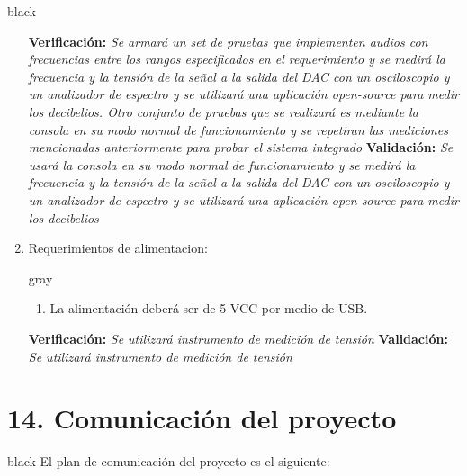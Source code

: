 \documentclass[11pt]{charter}
\begin{document}
\begin{consigna}{black}
\begin{enumerate}
	\textbf{Verificación:} \textit{Se armará un set de pruebas que implementen audios con frecuencias entre los rangos especificados en el requerimiento y se medirá la frecuencia y la tensión de la señal a la salida del DAC con un osciloscopio y  un analizador de espectro y se utilizará una aplicación \textit{open-source} para medir los decibelios. Otro conjunto de pruebas que se realizará es mediante la consola en su modo normal de funcionamiento y se repetiran las mediciones mencionadas anteriormente para probar el sistema integrado} \newline                                                                              
	\newline 
	\textbf{Validación:} \textit{Se usará la consola en su modo normal de funcionamiento y se medirá la frecuencia y la tensión de la señal a la salida del DAC con un osciloscopio y  un analizador de espectro y se utilizará una aplicación \textit{open-source} para medir los decibelios}
\item Requerimientos de alimentacion:
	\begin{consigna}{gray}
	\begin{enumerate}
	\item La alimentación deberá ser de 5 VCC por medio de USB.
	\end{enumerate}
	\end{consigna}
	\textbf{Verificación:} \textit{Se utilizará instrumento de medición de tensión} \newline 			\newline                                                                              
	\textbf{Validación:} \textit{Se utilizará instrumento de medición de tensión}
\end{enumerate}

\end{consigna}

\section{14. Comunicación del proyecto}
\label{sec:comunicaciones}

\begin{consigna}{black}
El plan de comunicación del proyecto es el siguiente:
\end{consigna}
\end{document}

